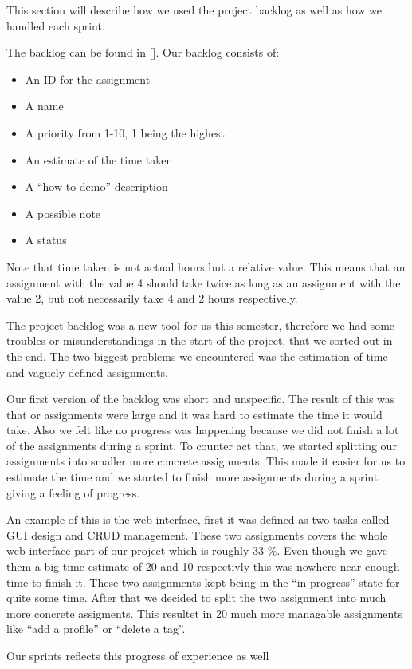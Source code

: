 This section will describe how we used the project backlog as well as how we handled each sprint.

The backlog can be found in [].
Our backlog consists of: 
\begin{itemize}
\item An ID for the assignment
\item A name 
\item A priority from 1-10, 1 being the highest
\item An estimate of the time taken
\item A ``how to demo'' description
\item A possible note
\item A status 	
\end{itemize}
Note that time taken is not actual hours but a relative value. This means that an assignment with the value 4 should take twice as long as an assignment with the value 2, but not necessarily take 4 and 2 hours respectively.

The project backlog was a new tool for us this semester, therefore we had some troubles or misunderstandings in the start of the project, that we sorted out in the end. The two biggest problems we encountered was the estimation of time and vaguely defined assignments. 

Our first version of the backlog was short and unspecific. The result of this was that or assignments were large and it was hard to estimate the time it would take. Also we felt like no progress was happening because we did not finish a lot of the assignments during a sprint. To counter act that, we started splitting our assignments into smaller more concrete assignments. This made it easier for us to estimate the time and we started to finish more assignments during a sprint giving a feeling of progress. 

An example of this is the web interface, first it was defined as two tasks called GUI design and CRUD management. These two assignments covers the whole web interface part of our project which is roughly 33 \%. Even though we gave them a big time estimate of 20 and 10 respectivly this was nowhere near enough time to finish it. These two assignments kept being in the ``in progress'' state for quite some time. After that we decided to split the two assignment into much more concrete assigments. This resultet in 20 much more managable assignments like ``add a profile'' or ``delete a tag''. 

Our sprints reflects this progress of experience as well

